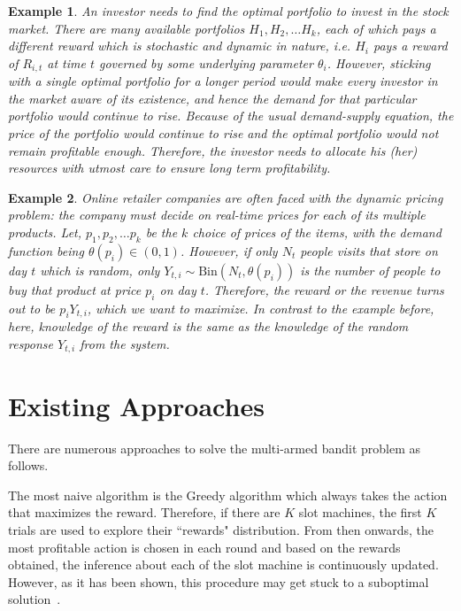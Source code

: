 \documentclass[11pt]{article}
\newtheorem{example}{Example}
\begin{document}
\begin{example}\label{example:2}
    An investor needs to find the optimal portfolio to invest in the stock market. There are many available portfolios $H_1, H_2, \dots H_k$, each of which pays a different reward which is stochastic and dynamic in nature, i.e. $H_i$ pays a reward of $R_{i,t}$ at time $t$ governed by some underlying parameter $\theta_{i}$. However, sticking with a single optimal portfolio for a longer period would make every investor in the market aware of its existence, and hence the demand for that particular portfolio would continue to rise. Because of the usual demand-supply equation, the price of the portfolio would continue to rise and the optimal portfolio would not remain profitable enough. Therefore, the investor needs to allocate his (her) resources with utmost care to ensure long term profitability.
\end{example}

\begin{example}\label{example:3}
    Online retailer companies are often faced with the dynamic pricing problem: the company must decide on real-time prices for each of its multiple products. Let, $p_1, p_2, \dots p_k$ be the $k$ choice of prices of the items, with the demand function being $\theta(p_i) \in (0, 1)$. However, if only $N_t$ people visits that store on day $t$ which is random, only $Y_{t, i} \sim \text{Bin}(N_t, \theta(p_i))$ is the number of people to buy that product at price $p_i$ on day $t$. Therefore, the reward or the revenue turns out to be $p_i Y_{t, i}$, which we want to maximize. In contrast to the example before, here, knowledge of the reward is the same as the knowledge of the random response $Y_{t, i}$ from the system. 
\end{example}


\section{Existing Approaches}

There are numerous approaches to solve the multi-armed bandit problem as follows.

The most naive algorithm is the Greedy algorithm which always takes the action that maximizes the reward. Therefore, if there are $K$ slot machines, the first $K$ trials are used to explore their ``rewards" distribution. From then onwards, the most profitable action is chosen in each round and based on the rewards obtained, the inference about each of the slot machine is continuously updated. However, as it has been shown, this procedure may get stuck to a suboptimal solution~\cite{russo2017tutorial}.
\end{document}
